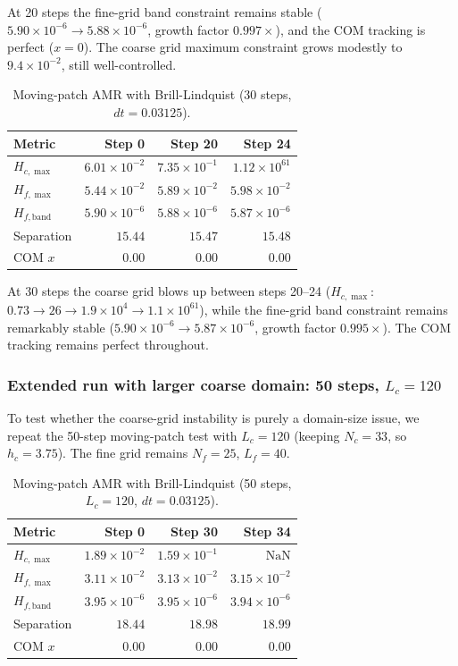 At 20 steps the fine-grid band constraint remains stable ($5.90\times 10^{-6} \to 5.88\times 10^{-6}$, growth factor $0.997\times$), and the COM tracking is perfect ($x=0$). The coarse grid maximum constraint grows modestly to $9.4\times 10^{-2}$, still well-controlled.

\begin{table}[t]
\centering
\caption{Moving-patch AMR with Brill-Lindquist (30 steps, $dt=0.03125$).}
\label{tab:amr-moving-30}
\begin{tabular}{lrrr}
\hline
Metric & Step 0 & Step 20 & Step 24 \\
\hline
$H_{c,\max}$ & $6.01\times 10^{-2}$ & $7.35\times 10^{-1}$ & $1.12\times 10^{61}$ \\
$H_{f,\max}$ & $5.44\times 10^{-2}$ & $5.89\times 10^{-2}$ & $5.98\times 10^{-2}$ \\
$H_{f,\text{band}}$ & $5.90\times 10^{-6}$ & $5.88\times 10^{-6}$ & $5.87\times 10^{-6}$ \\
Separation & $15.44$ & $15.47$ & $15.48$ \\
COM $x$ & $0.00$ & $0.00$ & $0.00$ \\
\hline
\end{tabular}
\end{table}

At 30 steps the coarse grid blows up between steps 20--24 ($H_{c,\max}$: $0.73 \to 26 \to 1.9\times 10^4 \to 1.1\times 10^{61}$), while the fine-grid band constraint remains remarkably stable ($5.90\times 10^{-6} \to 5.87\times 10^{-6}$, growth factor $0.995\times$). The COM tracking remains perfect throughout.

\subsubsection{Extended run with larger coarse domain: 50 steps, $L_c=120$}

To test whether the coarse-grid instability is purely a domain-size issue, we repeat the 50-step moving-patch test with $L_c=120$ (keeping $N_c=33$, so $h_c=3.75$). The fine grid remains $N_f=25$, $L_f=40$.

\begin{table}[t]
\centering
\caption{Moving-patch AMR with Brill-Lindquist (50 steps, $L_c=120$, $dt=0.03125$).}
\label{tab:amr-moving-50}
\begin{tabular}{lrrr}
\hline
Metric & Step 0 & Step 30 & Step 34 \\
\hline
$H_{c,\max}$ & $1.89\times 10^{-2}$ & $1.59\times 10^{-1}$ & $\text{NaN}$ \\
$H_{f,\max}$ & $3.11\times 10^{-2}$ & $3.13\times 10^{-2}$ & $3.15\times 10^{-2}$ \\
$H_{f,\text{band}}$ & $3.95\times 10^{-6}$ & $3.95\times 10^{-6}$ & $3.94\times 10^{-6}$ \\
Separation & $18.44$ & $18.98$ & $18.99$ \\
COM $x$ & $0.00$ & $0.00$ & $0.00$ \\
\hline
\end{tabular}
\end{table}

